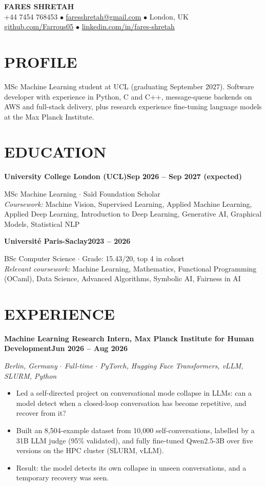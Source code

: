 \documentclass[10pt, a4paper]{article}
\newcommand{\entry}[2]{\vspace{5pt}\textbf{#1}\hfill\textbf{#2}\par}
\newcommand{\sub}[1]{\textit{#1}\par}
\begin{document}
\begin{center}
    {\huge \textbf{FARES SHRETAH}} \\[3pt]
    \small +44 7454 768453 $\bullet$ \href{mailto:faresshretah@gmail.com}{faresshretah@gmail.com} $\bullet$ London, UK \\
    \small \href{https://github.com/Farrous05}{github.com/Farrous05} $\bullet$ \href{https://www.linkedin.com/in/fares-shretah/}{linkedin.com/in/fares-shretah}
\end{center}

\section*{PROFILE}
MSc Machine Learning student at UCL (graduating September 2027). Software developer with experience in Python, C and C++, message-queue backends on AWS and full-stack delivery, plus research experience fine-tuning language models at the Max Planck Institute.

\section*{EDUCATION}
\entry{University College London (UCL)}{Sep 2026 -- Sep 2027 (expected)}
MSc Machine Learning $\cdot$ Sa\"id Foundation Scholar \\
\textit{Coursework:} Machine Vision, Supervised Learning, Applied Machine Learning, Applied Deep Learning, Introduction to Deep Learning, Generative AI, Graphical Models, Statistical NLP

\entry{Universit\'e Paris-Saclay}{2023 -- 2026}
BSc Computer Science $\cdot$ Grade: 15.43/20, top 4 in cohort \\
\textit{Relevant coursework:} Machine Learning, Mathematics, Functional Programming (OCaml), Data Science, Advanced Algorithms, Symbolic AI, Fairness in AI

\section*{EXPERIENCE}
\entry{Machine Learning Research Intern, Max Planck Institute for Human Development}{Jun 2026 -- Aug 2026}
\sub{Berlin, Germany $\cdot$ Full-time $\cdot$ PyTorch, Hugging Face Transformers, vLLM, SLURM, Python}
\begin{itemize}
    \item Led a self-directed project on conversational mode collapse in LLMs: can a model detect when a closed-loop conversation has become repetitive, and recover from it?
    \item Built an 8,504-example dataset from 10,000 self-conversations, labelled by a 31B LLM judge (95\% validated), and fully fine-tuned Qwen2.5-3B over five versions on the HPC cluster (SLURM, vLLM).
    \item Result: the model detects its own collapse in unseen conversations, and a temporary recovery was seen.
\end{itemize}
\end{document}
